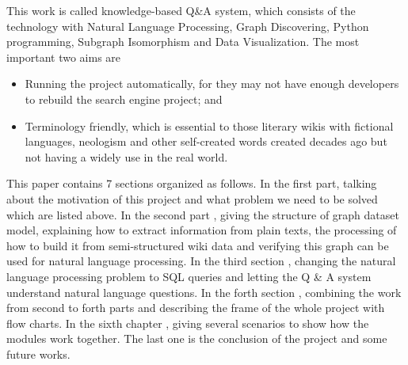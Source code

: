 This work is called knowledge-based Q\&A system, which consists of the technology with Natural Language Processing, Graph Discovering, Python programming, Subgraph Isomorphism and Data Visualization. The most important two aims are 
\begin{itemize}
	\item Running the project automatically, for they may not have enough developers to rebuild the search engine project; and
	\item Terminology friendly, which is essential to those literary wikis with fictional languages, neologism and other self-created words created decades ago but not having a widely use in the real world.
\end{itemize}
This paper contains 7 sections organized as follows. In the first  part, talking about the motivation of this project and what problem we need to be solved which are listed above. In the second part , giving the structure of graph dataset model, explaining how to extract information from plain texts, the processing of how to build it from semi-structured wiki data and verifying this graph can be used for natural language processing. In the third section , changing the natural language processing problem to SQL queries and letting the Q \& A system understand natural language questions. In the forth section , combining the work from second to forth parts and describing the frame of the whole project with flow charts. In the sixth chapter , giving several scenarios to show how the modules work together. The last one is the conclusion of the project and some future works.
